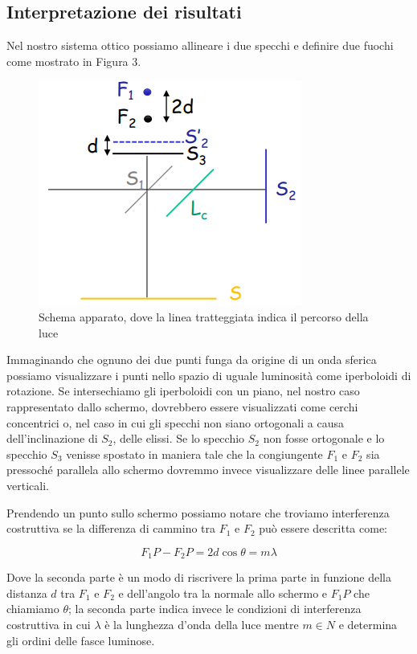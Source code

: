 \documentclass{article}
\begin{document}
\subsection{Interpretazione dei risultati}
Nel nostro sistema ottico possiamo allineare i due specchi e definire due fuochi come mostrato in Figura 3.

\begin{figure}[h!]
  \centering
  \includegraphics[width=0.3\linewidth]{IM fuochi}
  \caption{Schema apparato, dove la linea tratteggiata indica il percorso della luce}
\end{figure}


Immaginando che ognuno dei due punti funga da origine di un onda sferica possiamo visualizzare i punti nello spazio di uguale luminosità come iperboloidi di rotazione. Se intersechiamo gli iperboloidi con un piano, nel nostro caso rappresentato dallo schermo, dovrebbero essere visualizzati come cerchi concentrici o, nel caso in cui gli specchi non siano ortogonali a causa dell'inclinazione di $S_2$, delle elissi. 
Se lo specchio $S_2$ non fosse ortogonale e lo specchio $S_3$ venisse spostato in maniera tale che la congiungente $F_1$ e $F_2$ sia pressoché parallela allo schermo dovremmo invece visualizzare delle linee parallele verticali. 

\vspace{3mm}

Prendendo un punto sullo schermo possiamo notare che troviamo interferenza costruttiva se la differenza di cammino tra $F_1$ e $F_2$ può essere descritta come:

\begin{equation} 
F_1P - F_2 P = 2d \cos{\theta} = m \lambda 
\end{equation}

Dove la seconda parte è un modo di riscrivere la prima parte in funzione della distanza $d$ tra $F_1$ e $F_2$ e dell'angolo tra la normale allo schermo e $F_1 P$ che chiamiamo $\theta$; la seconda parte indica invece le condizioni di interferenza costruttiva in cui $\lambda$ è la lunghezza d'onda della luce mentre $m \in N$ %
e determina gli ordini delle fasce luminose.
\end{document}
